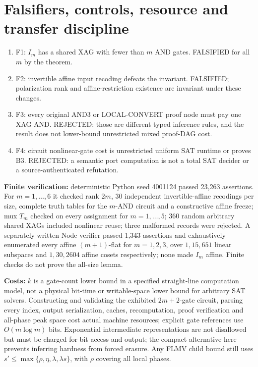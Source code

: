 \documentclass[11pt]{article}
\begin{document}
\section*{Falsifiers, controls, resource and transfer discipline}
\begin{enumerate}
\item[] F1: $I_m$ has a shared XAG with fewer than $m$ AND gates. FALSIFIED for all $m$ by the theorem.
\item[] F2: invertible affine input recoding defeats the invariant. FALSIFIED; polarization rank and affine-restriction existence are invariant under these changes.
\item[] F3: every original AND3 or LOCAL-CONVERT proof node must pay one XAG AND. REJECTED: those are different typed inference rules, and the result does not lower-bound unrestricted mixed proof-DAG cost.
\item[] F4: circuit nonlinear-gate cost is unrestricted uniform SAT runtime or proves B3. REJECTED: a semantic port computation is not a total SAT decider or a source-authenticated refutation.
\end{enumerate}
\par\noindent\textbf{Finite verification:} deterministic Python seed 4001124 passed 23,263 assertions. For $m=1,\ldots,6$ it checked rank $2m$, 30 independent invertible-affine recodings per size, complete truth tables for the $m$-AND circuit and a constructive affine freeze; mux $T_m$ checked on every assignment for $m=1,\ldots,5$; 360 random arbitrary shared XAGs included nonlinear reuse; three malformed records were rejected. A separately written Node verifier passed 1,343 assertions and exhaustively enumerated every affine $(m+1)$-flat for $m=1,2,3$, over $1,15,651$ linear subspaces and $1,30,2604$ affine cosets respectively; none made $I_m$ affine. Finite checks do not prove the all-size lemma.
\par\noindent\textbf{Costs:} $k$ is a gate-count lower bound in a specified straight-line computation model, not a physical bit-time or writable-space lower bound for arbitrary SAT solvers. Constructing and validating the exhibited $2m+2$-gate circuit, parsing every index, output serialization, caches, recomputation, proof verification and all-phase peak space cost actual machine resources; explicit gate references use $O(m\log m)$ bits. Exponential intermediate representations are not disallowed but must be charged for bit access and output; the compact alternative here prevents inferring hardness from forced erasure. Any FLMV child bound still uses $s'\le\max\{\rho,\eta,\lambda,\lambda s\}$, with $\rho$ covering all local phases.
\end{document}
